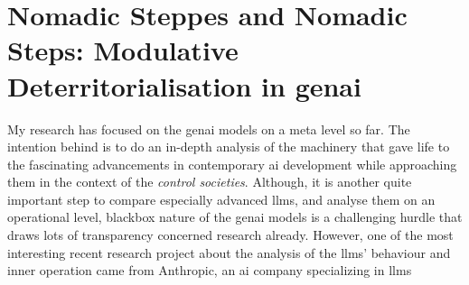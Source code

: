 \section{Nomadic Steppes and Nomadic Steps: Modulative Deterritorialisation in
  \Gls{genai} }


My research has focused on the \gls{genai} models on a meta level so far. The
intention behind is to do an in-depth analysis of the machinery that gave life
to the fascinating advancements in contemporary \gls{ai} development while
approaching them in the context of the \textit{control societies}. Although, it
is another quite important step to compare especially advanced \glspl{llm}, and
analyse them on an operational level, blackbox nature of the \gls{genai} models
is a challenging hurdle that draws lots of transparency concerned research
already. However, one of the most interesting recent research project about the
analysis of the \glspl{llm}' behaviour and inner operation came from
Anthropic,
an \gls{ai} company specializing in \glspl{llm}  



